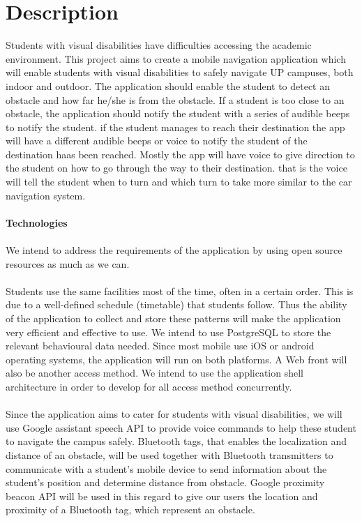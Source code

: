 \documentclass[runningheads,a4paper]{article}
\begin{document}
	\begingroup
	
	\tableofcontents
	\endgroup
	\newpage
	
	\section{Description}
	Students with visual disabilities have difficulties accessing the academic environment. This project aims to create a mobile navigation application which will enable students with visual disabilities to safely navigate UP campuses, both indoor and outdoor. The application should enable the student to detect an obstacle and how far he/she is from the obstacle. If a student is too close to an obstacle, the application should notify the student with a series of audible beeps to notify the student. if the student manages to reach their destination the app will have a different audible beeps or voice to notify the student of the destination haas been reached. Mostly the app will have  voice to give direction to the student on how to go through the way to their destination. that is the voice will tell the student when to turn and which turn to take more similar to the car navigation system.\\
   
    
    \textbf{\\Technologies\\} 
   \\ We intend to address the requirements of the application by using open source resources as much as we can.\\
    \\Students use the same facilities most of the time, often in a certain order. This is due to a well-defined schedule (timetable) that students follow. Thus the ability of the application to collect and store these patterns will make the application very efficient and effective to use. We intend to use PostgreSQL to store the relevant behavioural data needed. Since most mobile use iOS or android operating systems, the application will run on both platforms. A Web front will also be another access method. We intend to use the application shell architecture in order to develop for all access method concurrently.\\
    \\Since the application aims to cater for students with visual disabilities, we will use Google assistant speech API to provide voice commands to help these student to navigate the campus safely. Bluetooth tags, that enables the localization and distance of an obstacle, will be used together with Bluetooth transmitters to communicate with a student’s mobile device to send information about the student’s position and determine distance from obstacle. Google proximity beacon API will be used in this regard to give our users the location and proximity of a Bluetooth tag, which represent an obstacle. \\
   
\end{document}
